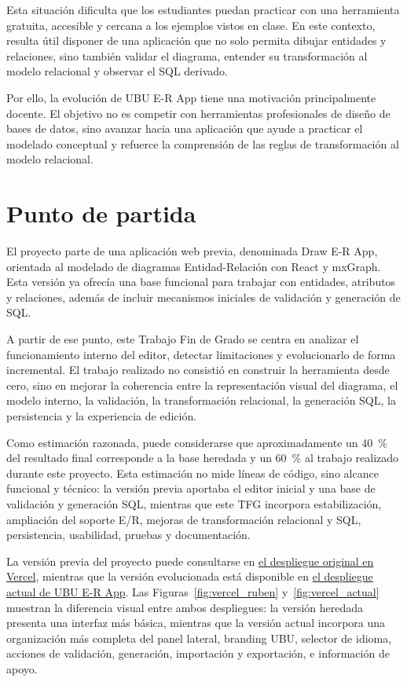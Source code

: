 Esta situación dificulta que los estudiantes puedan practicar con una herramienta gratuita, accesible y cercana a los ejemplos vistos en clase. En este contexto, resulta útil disponer de una aplicación que no solo permita dibujar entidades y relaciones, sino también validar el diagrama, entender su transformación al modelo relacional y observar el SQL derivado.

Por ello, la evolución de UBU E-R App tiene una motivación principalmente docente. El objetivo no es competir con herramientas profesionales de diseño de bases de datos, sino avanzar hacia una aplicación que ayude a practicar el modelado conceptual y refuerce la comprensión de las reglas de transformación al modelo relacional.

\section{Punto de partida}

El proyecto parte de una aplicación web previa, denominada Draw E-R App, orientada al modelado de diagramas Entidad-Relación con React y mxGraph. Esta versión ya ofrecía una base funcional para trabajar con entidades, atributos y relaciones, además de incluir mecanismos iniciales de validación y generación de SQL.

A partir de ese punto, este Trabajo Fin de Grado se centra en analizar el funcionamiento interno del editor, detectar limitaciones y evolucionarlo de forma incremental. El trabajo realizado no consistió en construir la herramienta desde cero, sino en mejorar la coherencia entre la representación visual del diagrama, el modelo interno, la validación, la transformación relacional, la generación SQL, la persistencia y la experiencia de edición.

Como estimación razonada, puede considerarse que aproximadamente un 40~\% del resultado final corresponde a la base heredada y un 60~\% al trabajo realizado durante este proyecto. Esta estimación no mide líneas de código, sino alcance funcional y técnico: la versión previa aportaba el editor inicial y una base de validación y generación SQL, mientras que este TFG incorpora estabilización, ampliación del soporte E/R, mejoras de transformación relacional y SQL, persistencia, usabilidad, pruebas y documentación.

La versión previa del proyecto puede consultarse en \href{https://draw-entity-relation.vercel.app/}{el despliegue original en Vercel}, mientras que la versión evolucionada está disponible en \href{https://draw-entity-relation-opal.vercel.app/}{el despliegue actual de UBU E-R App}. Las Figuras~\ref{fig:vercel_ruben} y~\ref{fig:vercel_actual} muestran la diferencia visual entre ambos despliegues: la versión heredada presenta una interfaz más básica, mientras que la versión actual incorpora una organización más completa del panel lateral, branding UBU, selector de idioma, acciones de validación, generación, importación y exportación, e información de apoyo.

